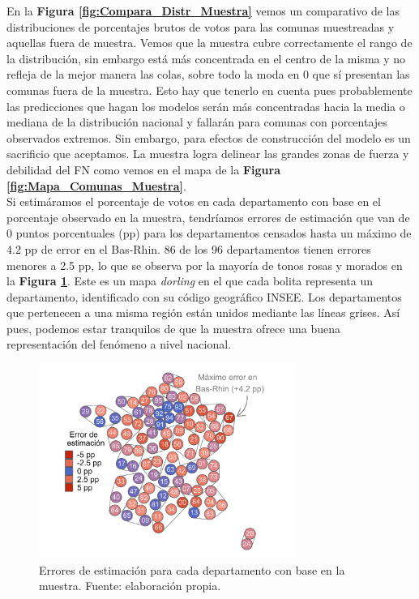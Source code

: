 En la \textbf{Figura \ref{fig:Compara_Distr_Muestra}} vemos un comparativo de las distribuciones de porcentajes brutos de votos para las comunas muestreadas y aquellas fuera de muestra. Vemos que la muestra cubre correctamente el rango de la distribución, sin embargo está más concentrada en el centro de la misma y no refleja de la mejor manera las colas, sobre todo la moda en 0 que sí presentan las comunas fuera de la muestra. Esto hay que tenerlo en cuenta pues probablemente las predicciones que hagan los modelos serán más concentradas hacia la media o mediana de la distribución nacional y fallarán para comunas con porcentajes observados extremos. Sin embargo, para efectos de construcción del modelo es un sacrificio que aceptamos. La muestra logra delinear las grandes zonas de fuerza y debilidad del FN como vemos en el mapa de la \textbf{Figura \ref{fig:Mapa_Comunas_Muestra}}.\\

Si estimáramos el porcentaje de votos en cada departamento con base en el porcentaje observado en la muestra, tendríamos errores de estimación que van de 0 puntos porcentuales (pp) para los departamentos censados hasta un máximo de 4.2 pp de error en el Bas-Rhin. 86 de los 96 departamentos tienen errores menores a 2.5 pp, lo que se observa por la mayoría de tonos rosas y morados en la \textbf{Figura \ref{fig:Errores_Est_Muestra}}. Este es un mapa \textit{dorling} en el que cada bolita representa un departamento, identificado con su código geográfico INSEE. Los departamentos que pertenecen a una misma región están unidos mediante las líneas grises. Así pues, podemos estar tranquilos de que la muestra ofrece una buena representación del fenómeno a nivel nacional.\\ 

\begin{figure}[h]
	\centering
	\includegraphics[width = 0.75\textwidth]{Figs/AED/Dorling_Errores_P12_FN_MUESTRA}
	\caption{Errores de estimación para cada departamento con base en la muestra. Fuente: elaboración propia.}
	\label{fig:Errores_Est_Muestra}	
\end{figure}

